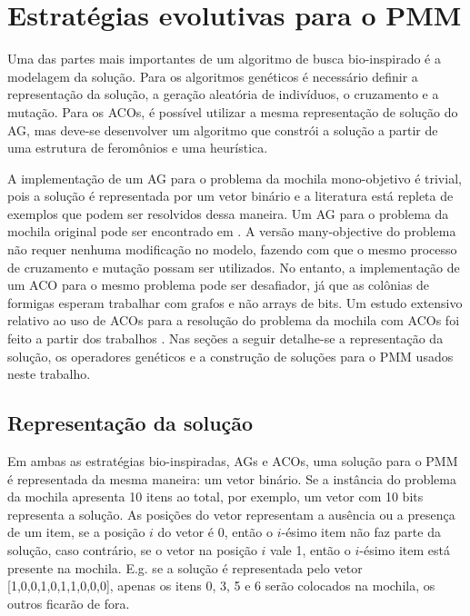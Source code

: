 \chapter[Estratégias evolutivas para o PMM]{Estratégias evolutivas para o PMM}

Uma das partes mais importantes de um algoritmo de busca bio-inspirado é a modelagem da solução. Para os algoritmos genéticos é necessário definir a representação da solução, a geração aleatória de indivíduos, o cruzamento e a mutação. Para os ACOs, é possível utilizar a mesma representação de solução do AG, mas deve-se desenvolver um algoritmo que constrói a solução a partir de uma estrutura de feromônios e uma heurística.

A implementação de um AG para o problema da mochila mono-objetivo é trivial, pois a solução é representada por um vetor binário e a literatura está repleta de exemplos que podem ser resolvidos dessa maneira. Um AG para o problema da mochila original pode ser encontrado em \cite{Hristakeva2013}. A versão many-objective do problema não requer nenhuma modificação no modelo, fazendo com que o mesmo processo de cruzamento e mutação possam ser utilizados. No entanto, a implementação de um ACO para o mesmo problema pode ser desafiador, já que as colônias de formigas esperam trabalhar com grafos e não arrays de bits. Um estudo extensivo relativo ao uso de ACOs para a resolução do problema da mochila com ACOs foi feito a partir dos trabalhos \cite{Ke2010,kong2008,changdar2013,Alaya2004,Alaya2007}. Nas seções a seguir detalhe-se a representação da solução, os operadores genéticos e a construção de soluções para o PMM usados neste trabalho.

\section{Representação da solução}
Em ambas as estratégias bio-inspiradas, AGs e ACOs, uma solução para o PMM é representada da mesma maneira: um vetor binário. Se a instância do problema da mochila apresenta 10 itens ao total, por exemplo, um vetor com 10 bits representa a solução. As posições do vetor representam a ausência ou a presença de um item, se a posição $i$ do vetor é 0, então o $i$-ésimo item não faz parte da solução, caso contrário, se o vetor na posição $i$ vale 1, então o  $i$-ésimo item está presente na mochila. E.g. se a solução é representada pelo vetor [1,0,0,1,0,1,1,0,0,0], apenas os itens 0, 3, 5 e 6 serão colocados na mochila, os outros ficarão de fora.

